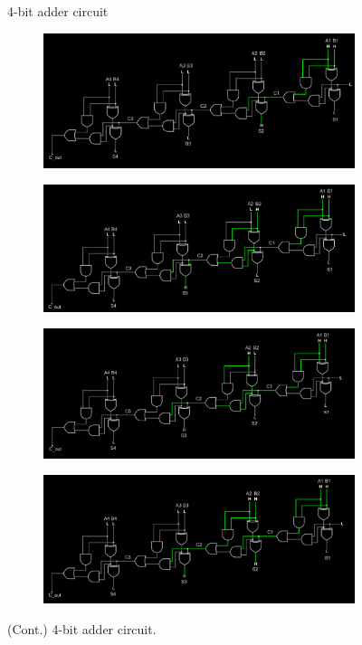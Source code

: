 \documentclass{article}
\begin{document}
\begin{figure}[H]
		\caption{4-bit adder circuit}
		\label{4bit1}
	\end{figure}
	
	
	\begin{figure}
		\centering
		
		\begin{subfigure}[t]{.8\textwidth}
			\centering
			\includegraphics[width=\textwidth]{4bit/4bit_001.png}
		\end{subfigure}
	
		\begin{subfigure}[b]{0.8\textwidth}
			\includegraphics[width=\textwidth]{4bit/4bit_011.png}
		\end{subfigure}
	
		\begin{subfigure}[b]{0.8\textwidth}
			\includegraphics[width=\textwidth]{4bit/4bit_101.png}
		\end{subfigure}
		
		\begin{subfigure}[b]{0.8\textwidth}
			\includegraphics[width=\textwidth]{4bit/4bit_111.png}
		\end{subfigure}
		\caption{(Cont.) 4-bit adder circuit.}
		\label{4bit2}
	\end{figure}
\end{document}
